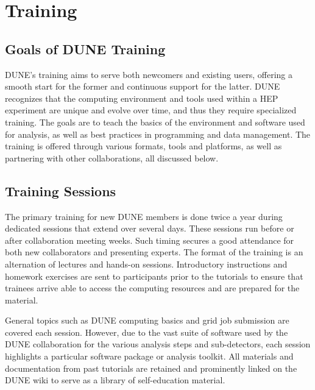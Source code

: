 \documentclass[../main-v1.tex]{subfiles}
\begin{document}
\section{Training }


\subsection{Goals of DUNE Training}
DUNE’s training aims to serve both newcomers and existing users, offering a smooth start for the former and continuous support for the latter. %
DUNE recognizes that the computing environment and tools used within a HEP experiment are unique and evolve over time, and thus they require specialized training. The goals are to teach the basics of the environment and software used for analysis, as well as best practices in programming and data management. The training is offered through various formats, tools and platforms, as well as partnering with other collaborations, all discussed below. 



\subsection{Training Sessions}
The primary training for new DUNE members is done twice a year during  dedicated sessions that extend over several days. These sessions run before or after collaboration meeting weeks. Such timing secures a good attendance for both new collaborators and presenting experts.
The format of the training is an alternation of lectures and hands-on sessions. Introductory instructions and homework exercises are sent to participants prior to the tutorials to ensure that trainees 
arrive able to access the computing resources and are prepared for the material. %


General topics such as DUNE computing basics and grid job submission are covered each %
session. However, due to the vast suite of software used by the DUNE collaboration for the various analysis steps and sub-detectors, each %
session highlights a particular software package or analysis toolkit.  All materials and documentation from past tutorials are retained and prominently linked on the DUNE wiki to serve as a library of self-education material. %
\end{document}

